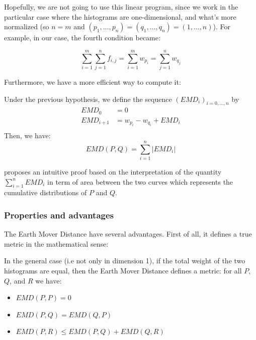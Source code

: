 Hopefully, we are not going to use this linear program, since we work in the particular case where the histograms are one-dimensional, and what's more normalized (so $n = m$ and $(p_1,\dots,p_n) = (q_1,\dots,q_n) = (1,\dots,n)$). For example, in our case, the fourth condition became:

\[
	 \sum_{i=1}^m \sum_{j=1}^n f_{i,j} = \sum_{i=1}^m w_{p_i} = \sum_{j=1}^n w_{q_j}
\]

Furthermore, we have a more efficient way to compute it:

\begin{theoreme}
	Under the previous hypothesis, we define the sequence $(EMD_i)_{i=0,\dots,n}$ by
\[
	\begin{aligned}
		EMD_0 &= 0\\
		EMD_{i+1} &= w_{p_i} - w_{q_i} + EMD_i\\
	\end{aligned}
\]
	Then, we have: 
\[
	EMD(P,Q) = \sum_{i=1}^n{ \left| EMD_i \right|}
\]
\end{theoreme}

\cite{EMD-proof} proposes an intuitive proof based on the interpretation of the quantity $\sum_{i=1}^n{EMD_i}$ in term of area between the two curves which represents the cumulative distributions of $P$ and $Q$.

\subsubsection{Properties and advantages}

The Earth Mover Distance have several advantages. First of all, it defines a true metric in the mathematical sense:

\begin{theoreme}
	In the general case (i.e not only in dimension 1), if the total weight of the two histograms are equal, then the Earth Mover Distance defines a metric: for all $P$, $Q$, and $R$ we have:
	\begin{itemize}
		\item $EMD(P,P) = 0$
		\item $EMD(P,Q) = EMD(Q,P)$
		\item $EMD(P,R) \leq EMD(P,Q) + EMD(Q,R)$
	\end{itemize}
\end{theoreme}

